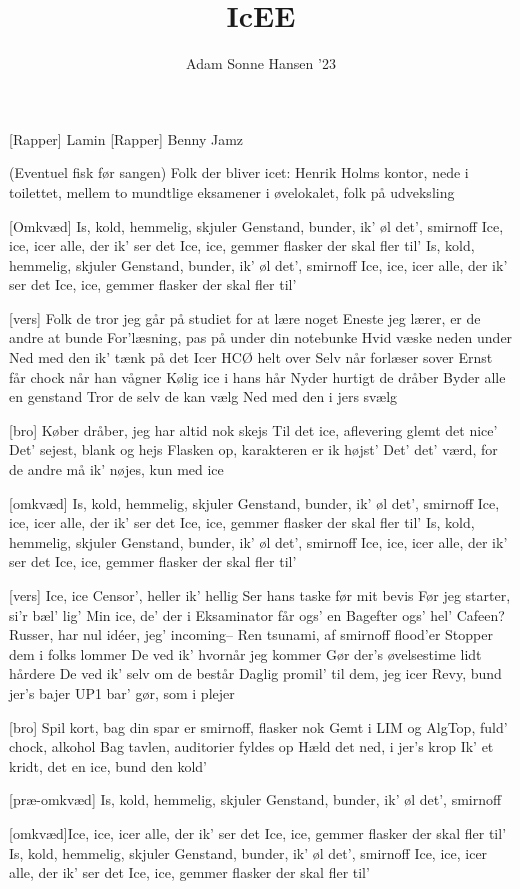 \documentclass[a4paper,11pt]{article}
\title{IcEE}
\author{Adam Sonne Hansen '23}
\begin{document}
\maketitle

\begin{roles}
[Rapper] Lamin
[Rapper] Benny Jamz
\end{roles}
(Eventuel fisk før sangen) Folk der bliver icet: Henrik Holms kontor, nede i toilettet, mellem to mundtlige eksamener i øvelokalet, folk på udveksling

\begin{song}
  [Omkvæd] Is, kold, hemmelig, skjuler
  Genstand, bunder, ik' øl det', smirnoff
  Ice, ice, icer alle, der ik' ser det
  Ice, ice, gemmer flasker der skal fler til'
  Is, kold, hemmelig, skjuler
  Genstand, bunder, ik' øl det', smirnoff
  Ice, ice, icer alle, der ik' ser det
  Ice, ice, gemmer flasker der skal fler til'

  [vers] Folk de tror jeg går på studiet for at lære noget
  Eneste jeg lærer, er de andre at bunde
  For'læsning, pas på under din notebunke
  Hvid væske neden under
  Ned med den ik' tænk på det
  Icer HCØ helt over
  Selv når forlæser sover
  Ernst får chock når han vågner
  Kølig ice i hans hår
  Nyder hurtigt de dråber
  Byder alle en genstand
  Tror de selv de kan vælg
  Ned med den i jers svælg

  [bro] Køber dråber, jeg har altid nok skejs
  Til det ice, aflevering glemt det nice'
  Det' sejest, blank og hejs
  Flasken op, karakteren er ik højst'
  Det' det' værd, for de andre må ik' nøjes, kun med ice
  
  [omkvæd] Is, kold, hemmelig, skjuler
  Genstand, bunder, ik' øl det', smirnoff
  Ice, ice, icer alle, der ik' ser det
  Ice, ice, gemmer flasker der skal fler til'
  Is, kold, hemmelig, skjuler
  Genstand, bunder, ik' øl det', smirnoff
  Ice, ice, icer alle, der ik' ser det
  Ice, ice, gemmer flasker der skal fler til'

[vers] Ice, ice
Censor', heller ik' hellig
Ser hans taske før mit bevis
Før jeg starter, si'r bæl' lig'
Min ice, de' der i
Eksaminator får ogs' en
Bagefter ogs' hel' Cafeen?
Russer, har nul idéer, jeg' incoming–
Ren tsunami, af smirnoff flood'er
Stopper dem i folks lommer
De ved ik' hvornår jeg kommer
Gør der's øvelsestime lidt hårdere
De ved ik' selv om de består
Daglig promil' til dem, jeg icer
Revy, bund jer's bajer
UP1 bar' gør, som i plejer 

[bro] Spil kort, bag din spar er smirnoff, flasker nok 
 Gemt i LIM og AlgTop, fuld' chock, alkohol
Bag tavlen, auditorier fyldes op
Hæld det ned, i jer's krop
Ik' et kridt, det en ice, bund den kold'

  
  [præ-omkvæd] Is, kold, hemmelig, skjuler
  Genstand, bunder, ik' øl det', smirnoff
  
  [omkvæd]Ice, ice, icer alle, der ik' ser det
  Ice, ice, gemmer flasker der skal fler til'
  Is, kold, hemmelig, skjuler
  Genstand, bunder, ik' øl det', smirnoff
  Ice, ice, icer alle, der ik' ser det
  Ice, ice, gemmer flasker der skal fler til'


\end{song}
\end{document}

